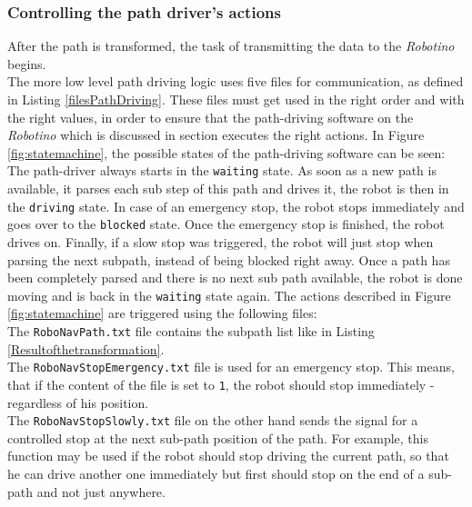 \subsubsection{Controlling the path driver's actions} 
After the path is transformed, the task of transmitting the data to the \textit{Robotino} begins. \\ 
The more low level path driving logic uses five files for communication, as defined in Listing  \ref{filesPathDriving}. These files must get used in the right order and with the right values, in order to ensure that the path-driving software on the \textit{Robotino} which is discussed in section executes the right actions. In Figure \ref{fig:statemachine}, the possible states of the path-driving software can be seen: %
\\ 
The path-driver always starts in the \texttt{waiting} state. As soon as a new path is available, it parses each sub step of this path and drives it, the robot is then in the \texttt{driving} state. In case of an emergency stop, the robot stops immediately and goes over to the \texttt{blocked} state. Once the emergency stop is finished, the robot drives on. Finally, if a slow stop was triggered, the robot will just stop when parsing the next subpath, instead of being blocked right away. Once a path has been completely parsed and there is no next sub path available, the robot is done moving and is back in the \texttt{waiting} state again. 
The actions described in Figure \ref{fig:statemachine} are triggered using the following files: \\ 
The \texttt{RoboNavPath.txt} file contains the subpath list like in Listing \ref{Resultofthetransformation}.\\
The \texttt{RoboNavStopEmergency.txt} file is used for an emergency stop. This means, that if the content of the file is set to \texttt{1}, the robot should stop immediately - regardless of his position. \\
The \texttt{RoboNavStopSlowly.txt} file on the other hand sends the signal for a controlled stop at the next sub-path position of the path. For example, this function may be used if the robot should stop driving the current path, so that he can drive another one immediately but first should stop on the end of a sub-path and not just anywhere.\\
